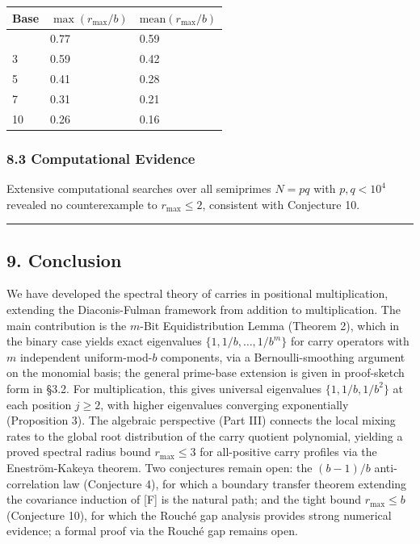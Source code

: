 \documentclass[
  11pt,
]{article}
\begin{document}
\begin{longtable}[]{@{}lll@{}}
\toprule\noalign{}
Base & \(\max(r_{\max}/b)\) & \(\text{mean}(r_{\max}/b)\) \\
\midrule\noalign{}
\endhead
\bottomrule\noalign{}
\endlastfoot
2 & 0.77 & 0.59 \\
3 & 0.59 & 0.42 \\
5 & 0.41 & 0.28 \\
7 & 0.31 & 0.21 \\
10 & 0.26 & 0.16 \\
\end{longtable}

\subsubsection{8.3 Computational Evidence}\label{computational-evidence}

Extensive computational searches over all semiprimes \(N = pq\) with
\(p, q < 10^4\) revealed no counterexample to \(r_{\max} \leq 2\), consistent
with Conjecture 10.

\begin{center}\rule{0.5\linewidth}{0.5pt}\end{center}

\newpage

\subsection{9. Conclusion}\label{conclusion}

We have developed the spectral theory of carries in positional multiplication,
extending the Diaconis-Fulman framework from addition to multiplication. The
main contribution is the \(m\)-Bit Equidistribution Lemma (Theorem 2), which in
the binary case yields exact eigenvalues
\(\lbrace{}1, 1/b, \ldots, 1/b^m\rbrace{}\) for carry operators with \(m\)
independent uniform-mod-\(b\) components, via a Bernoulli-smoothing argument on
the monomial basis; the general prime-base extension is given in proof-sketch
form in §3.2. For multiplication, this gives universal eigenvalues
\(\lbrace{}1, 1/b, 1/b^2\rbrace{}\) at each position \(j \geq 2\), with higher
eigenvalues converging exponentially (Proposition 3). The algebraic perspective
(Part III) connects the local mixing rates to the global root distribution of
the carry quotient polynomial, yielding a proved spectral radius bound
\(r_{\max} \leq 3\) for all-positive carry profiles via the Eneström-Kakeya
theorem. Two conjectures remain open: the \((b-1)/b\) anti-correlation law
(Conjecture 4), for which a boundary transfer theorem extending the covariance
induction of {[}F{]} is the natural path; and the tight bound
\(r_{\max} \leq b\) (Conjecture 10), for which the Rouché gap analysis provides
strong numerical evidence; a formal proof via the Rouché gap remains open.
\end{document}
